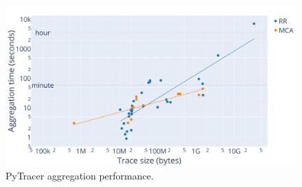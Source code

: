 \documentclass[10pt,journal,compsoc]{IEEEtran}
\newcommand{\pytracer}[0]{PyTracer\xspace}
\begin{document}
\begin{figure}
    \centering
    \includegraphics[width=\linewidth]{figure/performance_parsing.pdf}
    \caption{\pytracer aggregation performance.
    }
    \label{fig:performance_parsing}
\end{figure}
\end{document}
